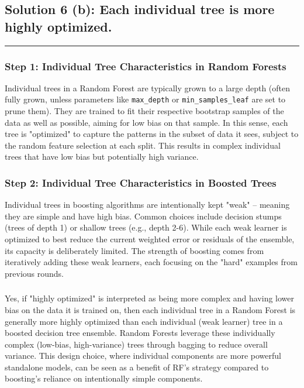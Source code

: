 \documentclass{article}
\begin{document}
\subsection*{Solution 6 (b): Each individual tree is more highly optimized.}
\noindent\rule{\textwidth}{0.4pt}

\subsubsection*{Step 1: Individual Tree Characteristics in Random Forests}
\parbox{\textwidth}{
Individual trees in a Random Forest are typically grown to a large depth (often fully grown, unless parameters like \texttt{max\_depth} or \texttt{min\_samples\_leaf} are set to prune them). They are trained to fit their respective bootstrap samples of the data as well as possible, aiming for low bias on that sample. In this sense, each tree is "optimized" to capture the patterns in the subset of data it sees, subject to the random feature selection at each split. This results in complex individual trees that have low bias but potentially high variance.
}

\subsubsection*{Step 2: Individual Tree Characteristics in Boosted Trees}
\parbox{\textwidth}{
Individual trees in boosting algorithms are intentionally kept "weak" – meaning they are simple and have high bias. Common choices include decision stumps (trees of depth 1) or shallow trees (e.g., depth 2-6). While each weak learner is optimized to best reduce the current weighted error or residuals of the ensemble, its capacity is deliberately limited. The strength of boosting comes from iteratively adding these weak learners, each focusing on the "hard" examples from previous rounds.
}

\subsubsection*{}
\parbox{\textwidth}{
Yes, if "highly optimized" is interpreted as being more complex and having lower bias on the data it is trained on, then each individual tree in a Random Forest is generally more highly optimized than each individual (weak learner) tree in a boosted decision tree ensemble. Random Forests leverage these individually complex (low-bias, high-variance) trees through bagging to reduce overall variance. This design choice, where individual components are more powerful standalone models, can be seen as a benefit of RF's strategy compared to boosting's reliance on intentionally simple components.
}
\end{document}
